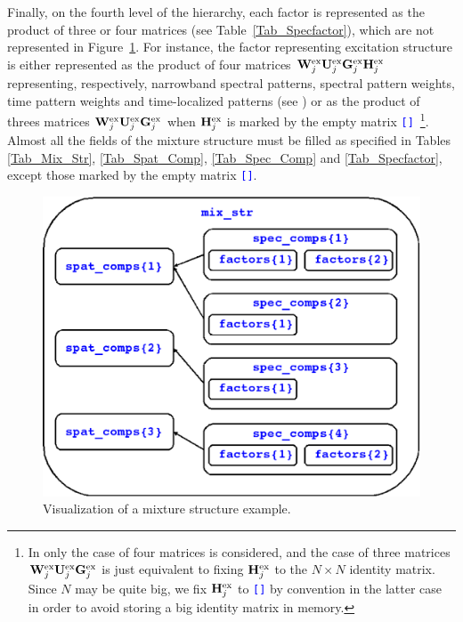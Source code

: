\documentclass{article}
\newcommand{\matlabcolor}{blue}
\newcommand{\matvar}[1]{\textcolor{\matlabcolor}{\tt {#1}}}
\begin{document}
Finally, on the fourth level of the hierarchy, each factor is represented as the product of three or four matrices
(see Table~\ref{Tab_Specfactor}), which are not represented in Figure~\ref{Fig_MixStruct}.
For instance, the factor representing excitation structure is either represented as the product of four matrices  ${\bf W}^{\rm ex}_j {\bf U}^{\rm ex}_j {\bf G}^{\rm ex}_j {\bf H}^{\rm ex}_j$ representing, respectively, narrowband spectral patterns, spectral pattern weights, time pattern weights and time-localized patterns (see \cite{Ozerov2010a}) or as the product of threes matrices  ${\bf W}^{\rm ex}_j {\bf U}^{\rm ex}_j {\bf G}^{\rm ex}_j$ when ${\bf H}^{\rm ex}_j$ is marked by the empty matrix \matvar{[]}~\footnote{In \cite{Ozerov2010a} only the case of four matrices is considered, and the case of three matrices ${\bf W}^{\rm ex}_j {\bf U}^{\rm ex}_j {\bf G}^{\rm ex}_j$ is just equivalent to fixing ${\bf H}^{\rm ex}_j$ to the $N \times N$ identity matrix. Since $N$ may be quite big, we fix ${\bf H}^{\rm ex}_j$ to \matvar{[]} by convention in the latter case in order to avoid storing a big identity matrix in memory.}.
Almost all the fields of the mixture structure must be filled as specified in Tables 
\ref{Tab_Mix_Str}, \ref{Tab_Spat_Comp}, \ref{Tab_Spec_Comp} and \ref{Tab_Specfactor}, except those marked by the empty matrix \matvar{[]}.

\begin{figure}[htbp]
  \begin{center}
    \leavevmode
    \includegraphics[width=12cm]{MixStruct_Ex}
    \caption{Visualization of a mixture structure example.}
    \label{Fig_MixStruct}
  \end{center}
\end{figure}
\end{document}
